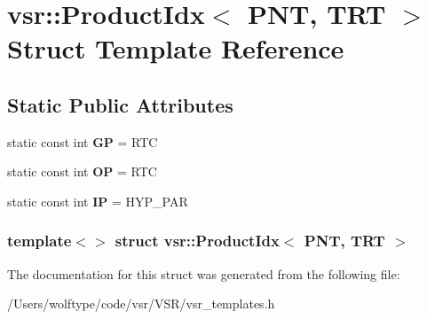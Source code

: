 \hypertarget{structvsr_1_1_product_idx_3_01_p_n_t_00_01_t_r_t_01_4}{\section{vsr\-:\-:Product\-Idx$<$ P\-N\-T, T\-R\-T $>$ Struct Template Reference}
\label{structvsr_1_1_product_idx_3_01_p_n_t_00_01_t_r_t_01_4}
}
\subsection*{Static Public Attributes}
\begin{DoxyCompactItemize}
\item 
\hypertarget{structvsr_1_1_product_idx_3_01_p_n_t_00_01_t_r_t_01_4_af8fa0b2482d083cfaf39f19c683db1c4}{static const int {\bfseries G\-P} = R\-T\-C}\label{structvsr_1_1_product_idx_3_01_p_n_t_00_01_t_r_t_01_4_af8fa0b2482d083cfaf39f19c683db1c4}

\item 
\hypertarget{structvsr_1_1_product_idx_3_01_p_n_t_00_01_t_r_t_01_4_a29cbc2e40a72e540e8fc57c693e4046b}{static const int {\bfseries O\-P} = R\-T\-C}\label{structvsr_1_1_product_idx_3_01_p_n_t_00_01_t_r_t_01_4_a29cbc2e40a72e540e8fc57c693e4046b}

\item 
\hypertarget{structvsr_1_1_product_idx_3_01_p_n_t_00_01_t_r_t_01_4_a63fc52a28faf0b1101a468d67d20f064}{static const int {\bfseries I\-P} = H\-Y\-P\-\_\-\-P\-A\-R}\label{structvsr_1_1_product_idx_3_01_p_n_t_00_01_t_r_t_01_4_a63fc52a28faf0b1101a468d67d20f064}

\end{DoxyCompactItemize}
\subsubsection*{template$<$$>$ struct vsr\-::\-Product\-Idx$<$ P\-N\-T, T\-R\-T $>$}



The documentation for this struct was generated from the following file\-:\begin{DoxyCompactItemize}
\item 
/\-Users/wolftype/code/vsr/\-V\-S\-R/vsr\-\_\-templates.\-h\end{DoxyCompactItemize}
